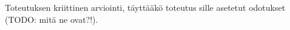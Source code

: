Toteutuksen kriittinen arviointi, täyttääkö toteutus sille asetetut odotukset (TODO: mitä ne ovat?!).